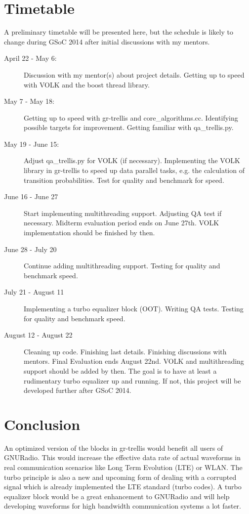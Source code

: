 \documentclass[11pt,		%
	    DIV12,		%
	    a4paper,		%
	    final,		%
	    halfparskip,	%
	    ]{scrartcl}		%
\begin{document}
\section{Timetable}
A preliminary timetable will be presented here, but the schedule is likely to change during GSoC 2014 after initial discussions with my mentors.   
\begin{description}
  \item[April 22 - May 6:] Discussion with my mentor(s) about project details. Getting up to speed with VOLK and the boost thread library.
  \item[May 7 - May 18:] Getting up to speed with gr-trellis and core\_algorithms.cc. Identifying possible targets for improvement. Getting familiar with qa\_trellis.py.
  \item[May 19 - June 15:] Adjust qa\_trellis.py for VOLK (if necessary). Implementing the VOLK library in gr-trellis to speed up data parallel tasks, e.g. the calculation of transition probabilities. Test for quality and benchmark for speed.
  \item[June 16 - June 27] Start implementing multithreading support. Adjusting QA test if necessary. Midterm evaluation period ends on June 27th. VOLK implementation should be finished by then.
  \item[June 28 - July 20] Continue adding multithreading support. Testing for quality and benchmark speed. 
  \item[July 21 - August 11] Implementing a turbo equalizer block (OOT). Writing QA tests. Testing for quality and benchmark speed. 
  \item[August 12 - August 22] Cleaning up code. Finishing last details. Finishing discussions with mentors. Final Evaluation ends August 22nd. VOLK and multithreading support should be added by then. The goal is to have at least a rudimentary turbo equalizer up and running. If not, this project will be developed further after GSoC 2014.     
\end{description}     
\section{Conclusion}
An optimized version of the blocks in gr-trellis would benefit all users of GNURadio. This would increase the effective data rate of actual waveforms in real communication scenarios like Long Term Evolution (LTE) or WLAN. The turbo principle is also a new and upcoming form of dealing with a corrupted signal which is already implemented the LTE standard (turbo codes). A turbo equalizer block would be a great enhancement to GNURadio and will help developing waveforms for high bandwidth communication systems a lot faster.
\end{document}
